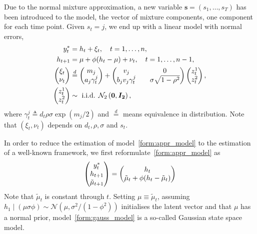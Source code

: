 Due to the normal mixture approximation, a new variable $\bm s=(s_1,\dots,s_T)$ has been introduced to the model, the vector of mixture components, one component for each time point. Given $s_t=j$, we end up with a linear model with normal errors,
\begin{equation}
\begin{alignedat}{1}\label{form:appr_model}
y_t^\ast & = h_t+\xi_t, \quad t=1,\dots,n, \\
h_{t+1} & = \mu+\phi(h_t-\mu)+\nu_t, \quad t=1,\dots,n-1, \\
\begin{pmatrix}
\xi_t \\
\nu_t
\end{pmatrix} &\overset{d}{=}
\begin{pmatrix}
m_j \\
a_j\gamma_t^j
\end{pmatrix} +
\begin{pmatrix}
v_j && 0 \\
b_jv_j\gamma_t^j && \sigma\sqrt{1-\rho^2}
\end{pmatrix}
\begin{pmatrix}
z_t^1 \\
z_t^2
\end{pmatrix}, \\
\begin{pmatrix}
z_t^1 \\
z_t^2
\end{pmatrix}
&\sim\text{ i.i.d. }\mathcal{N}_2\left(\bm{0},\bm{I_2}\right),
\end{alignedat}
\end{equation}
where $\gamma_t^j\triangleq d_t\rho\sigma\exp(m_j/2)$ and $\overset{d}{=}$ means equivalence in distribution. Note that $(\xi_t,\nu_t)$ depends on $d_t,\rho,\sigma$ and $s_t$.

In order to reduce the estimation of model~\eqref{form:appr_model} to the estimation of a well-known framework, we first reformulate~\eqref{form:appr_model} as
\begin{equation}\label{form:gauss_model}
\begin{pmatrix}
y_t^\ast \\
h_{t+1} \\
\tilde{\mu}_{t+1}
\end{pmatrix} =
\begin{pmatrix}
h_t \\
\tilde{\mu}_t+\phi(h_t-\tilde{\mu}_t)
\end{pmatrix}
\end{equation}
Note that $\tilde{\mu}_t$ is constant through $t$. Setting $\mu\equiv\tilde{\mu}_t$, assuming $h_1\mid(\mu\sigma\phi)\sim\mathcal{N}(\mu,\sigma^2/(1-\phi^2))$ initialises the latent vector and that $\mu$ has a normal prior, model~\eqref{form:gauss_model} is a so-called Gaussian state space model. 

